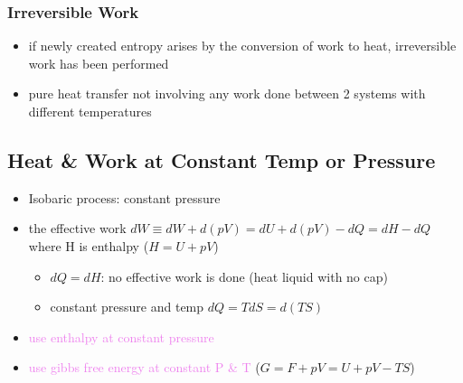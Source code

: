 \subsubsection{Irreversible Work}
\begin{itemize}
	\item if newly created entropy arises by the conversion of work to heat, irreversible
	      work has been performed
	\item pure heat transfer not involving any work done between 2 systems with different temperatures
\end{itemize}


\subsection{Heat \& Work at Constant Temp or Pressure}

\begin{itemize}
    \item Isobaric process: constant pressure
    \item the effective work $dW \equiv dW + d(pV) = dU + d(pV) -dQ = dH - dQ$
    where H is enthalpy ($H = U + pV$)
    \begin{itemize}
        \item $dQ = dH$: no effective work is done (heat liquid with no cap)
        \item constant pressure and temp $dQ = T dS = d(TS)$
    \end{itemize}
    \item \textcolor{violet}{use enthalpy at constant pressure}
    \item \textcolor{violet}{use gibbs free energy at constant P \& T} ($G = F + pV = U +pV - TS$)
\end{itemize}

